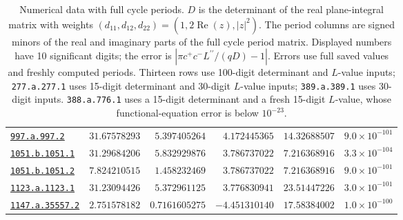 \begin{table}[htbp]
\begin{tabular}{@{}lrrrrr@{}}
\href{https://www.lmfdb.org/Genus2Curve/Q/997/a/997/2}{\texttt{997.a.997.2}} & $31.67578293$ & $5.397405264$ & $4.172445365$ & $14.32688507$ & $9.0\times 10^{-101}$ \\
\href{https://www.lmfdb.org/Genus2Curve/Q/1051/b/1051/1}{\texttt{1051.b.1051.1}} & $31.29684206$ & $5.832929876$ & $3.786737022$ & $7.216368916$ & $3.3\times 10^{-104}$ \\
\href{https://www.lmfdb.org/Genus2Curve/Q/1051/b/1051/2}{\texttt{1051.b.1051.2}} & $7.824210515$ & $1.458232469$ & $3.786737022$ & $7.216368916$ & $9.0\times 10^{-101}$ \\
\href{https://www.lmfdb.org/Genus2Curve/Q/1123/a/1123/1}{\texttt{1123.a.1123.1}} & $31.23094426$ & $5.372961125$ & $3.776830941$ & $23.51447226$ & $3.0\times 10^{-101}$ \\
\href{https://www.lmfdb.org/Genus2Curve/Q/1147/a/35557/2}{\texttt{1147.a.35557.2}} & $2.751578182$ & $0.7161605275$ & $-4.451310140$ & $17.58384002$ & $1.0\times 10^{-100}$ \\
\bottomrule\end{tabular}
\caption{Numerical data with full cycle periods. $D$ is the determinant of the real plane-integral matrix with weights $(d_{11},d_{12},d_{22})=(1,2\operatorname{Re}(z),|z|^2)$. The period columns are signed minors of the real and imaginary parts of the full cycle period matrix. Displayed numbers have 10 significant digits; the error is $|\pi c^+c^-L^{\prime\prime}/(qD)-1|$. Errors use full saved values and freshly computed periods. Thirteen rows use 100-digit determinant and $L$-value inputs; \texttt{277.a.277.1} uses 15-digit determinant and 30-digit $L$-value inputs; \texttt{389.a.389.1} uses 30-digit inputs. \texttt{388.a.776.1} uses a 15-digit determinant and a fresh 15-digit $L$-value, whose functional-equation error is below $10^{-23}$.}
\label{tab:data}
\end{table}

